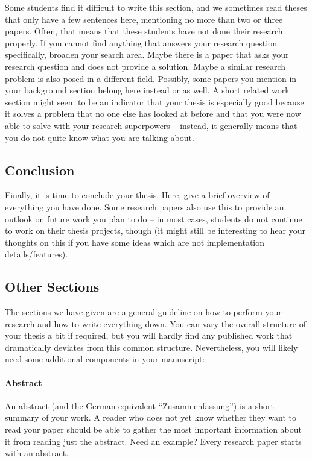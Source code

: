 \documentclass[a4paper]{article}
\begin{document}
Some students find it difficult to write this section, and we sometimes read theses that only have a few sentences here, mentioning no more than two or three papers.
Often, that means that these students have not done their research properly.
If you cannot find anything that answers your research question specifically, broaden your search area.
Maybe there is a paper that asks your research question and does not provide a solution.
Maybe a similar research problem is also posed in a different field.
Possibly, some papers you mention in your background section belong here instead or as well.
A short related work section might seem to be an indicator that your thesis is especially good because it solves a problem that no one else has looked at before and that you were now able to solve with your research superpowers -- instead, it generally means that you do not quite know what you are talking about.

\subsection{Conclusion}

Finally, it is time to conclude your thesis.
Here, give a brief overview of everything you have done.
Some research papers also use this to provide an outlook on future work you plan to do -- in most cases, students do not continue to work on their thesis projects, though (it might still be interesting to hear your thoughts on this if you have some ideas which are not implementation details/features).

\subsection{Other Sections}

The sections we have given are a general guideline on how to perform your research and how to write everything down.
You can vary the overall structure of your thesis a bit if required, but you will hardly find any published work that dramatically deviates from this common structure.
Nevertheless, you will likely need some additional components in your manuscript:

\paragraph{Abstract}

An abstract (and the German equivalent ``Zusammenfassung'') is a short summary of your work.
A reader who does not yet know whether they want to read your paper should be able to gather the most important information about it from reading just the abstract.
Need an example? Every research paper starts with an abstract.
\end{document}
